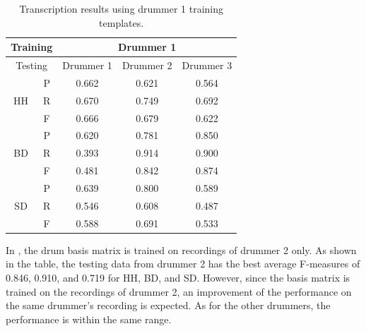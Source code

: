 \documentclass{article}
\begin{document}
\begin{table}[h]
\begin{center}
\begin{tabular}{|c|c|c|c|c|}
\hline
\multicolumn{2}{|c}{Training} & \multicolumn{3}{|c|}{Drummer 1}   \\ \hline
\multicolumn{2}{|c|}{Testing} & Drummer 1 & Drummer 2 & Drummer 3 \\ \hline
\multirow{3}{*}{HH}    & P    & 0.662     & 0.621     & 0.564     \\ \cline{2-5} 
                       & R    & 0.670     & 0.749     & 0.692     \\ \cline{2-5} 
                       & F    & 0.666     & 0.679     & 0.622     \\ \hline
\multirow{3}{*}{BD}    & P    & 0.620     & 0.781     & 0.850      \\ \cline{2-5} 
                       & R    & 0.393     & 0.914     & 0.900      \\ \cline{2-5} 
                       & F    & 0.481     & 0.842     & 0.874     \\ \hline
\multirow{3}{*}{SD}    & P    & 0.639     & 0.800     & 0.589     \\ \cline{2-5} 
                       & R    & 0.546     & 0.608     & 0.487     \\ \cline{2-5} 
                       & F    & 0.588     & 0.691     & 0.533     \\ \hline
\end{tabular}
 \caption{Transcription results using drummer 1 training templates.}
 \label{tab:trainDr1}
\end{center}
\end{table}

In , the drum basis matrix is trained on recordings of drummer 2 only. As shown in the table, the testing data from drummer 2 has the best average F-measures of 0.846, 0.910, and 0.719 for HH, BD, and SD. However, since the basis matrix is trained on the recordings of drummer 2, an improvement of the performance on the same drummer's recording is expected. As for the other drummers, the performance is within the same range.     
\end{document}
